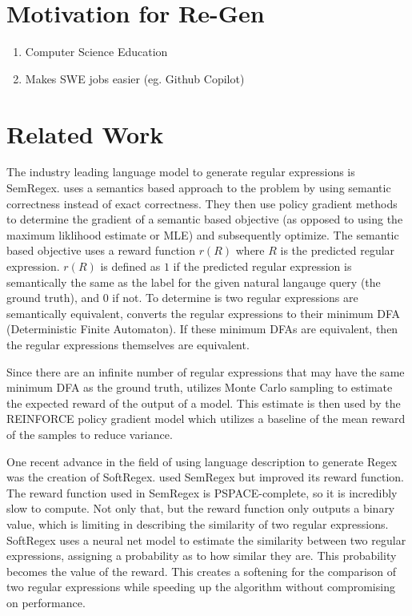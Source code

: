 \documentclass[11pt,a4paper]{article}
\begin{document}
\section{Motivation for Re-Gen}

\begin{enumerate}
	\item
	Computer Science Education

	\item
	Makes SWE jobs easier (eg. Github Copilot)

\end{enumerate}


\section{Related Work}
The industry leading language model to generate regular expressions is SemRegex. \cite{zhong-etal-2018-semregex} uses a semantics based approach to the problem by using semantic correctness instead of exact correctness. They then use policy gradient methods \cite{Williams:92} to determine the gradient of a semantic based objective (as opposed to using the maximum liklihood estimate or MLE) and subsequently optimize. The semantic based objective uses a reward function $r(R)$ where $R$ is the predicted regular expression. $r(R)$ is defined as $1$ if the predicted regular expression is semantically the same as the label for the given natural langauge query (the ground truth), and $0$ if not. To determine is two regular expressions are semantically equivalent, \cite{zhong-etal-2018-semregex} converts the regular expressions to their minimum DFA (Deterministic Finite Automaton). If these minimum DFAs are equivalent, then the regular expressions themselves are equivalent. 

Since there are an infinite number of regular expressions that may have the same minimum DFA as the ground truth, \cite{zhong-etal-2018-semregex} utilizes Monte Carlo sampling to estimate the expected reward of the output of a model. This estimate is then used by the REINFORCE policy gradient model \cite{Williams:92} which utilizes a baseline of the mean reward of the samples to reduce variance.

One recent advance in the field of using language description to generate Regex was the creation of SoftRegex. \cite{park-etal-2019-softregex} used SemRegex but improved its reward function. The reward function used in SemRegex is PSPACE-complete, so it is incredibly slow to compute. Not only that, but the reward function only outputs a binary value, which is limiting in describing the similarity of two regular expressions. SoftRegex uses a neural net model to estimate the similarity between two regular expressions, assigning a probability as to how similar they are. This probability becomes the value of the reward. This creates a softening for the comparison of two regular expressions while speeding up the algorithm without compromising on performance. 
\end{document}
